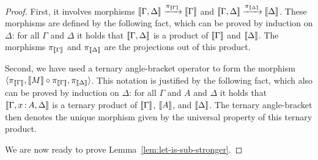 \begin{proof}
  First, it involves morphisms
   \(\left\llbracket \Gamma,\Delta\right\rrbracket \xrightarrow{\pi_{\left\llbracket \Gamma\right\rrbracket}} \left\llbracket \Gamma\right\rrbracket \)
  and
   \(\left\llbracket \Gamma,\Delta\right\rrbracket \xrightarrow{\pi_{\left\llbracket \Delta\right\rrbracket}} \left\llbracket \Delta\right\rrbracket\).
  These morphisms are defined by the following fact, which can be proved
  by induction on \(\Delta\): for all \(\Gamma\) and \(\Delta\)
  it holds that \(\left\llbracket \Gamma,\Delta\right\rrbracket\) is a product of \(\left\llbracket \Gamma\right\rrbracket\) and \(\left\llbracket \Delta\right\rrbracket\).
  The morphisms \(\pi_{\left\llbracket \Gamma\right\rrbracket}\) and \(\pi_{\left\llbracket \Delta\right\rrbracket}\) are the projections
  out of this product.

  Second, we have used a ternary angle-bracket operator
  to form the morphism \(\langle \pi_{\left\llbracket \Gamma\right\rrbracket},\left\llbracket M\right\rrbracket\circ\pi_{\left\llbracket \Gamma\right\rrbracket},\pi_{\left\llbracket \Delta\right\rrbracket}\rangle\).
  This notation is justified by the following fact, which also can be proved by induction on \(\Delta\):
  for all \(\Gamma\) and \(A\) and \(\Delta\) it holds that \(\left\llbracket \Gamma,x\,{:}\, A,\Delta\right\rrbracket\)
  is a ternary product of \(\left\llbracket \Gamma\right\rrbracket\), \(\left\llbracket A\right\rrbracket\), and \(\left\llbracket \Delta\right\rrbracket\).
  The ternary angle-bracket then denotes the unique morphism
  given by the universal property of this ternary product.

  We are now ready to prove Lemma~\ref{lem:let-is-sub-stronger}.


\end{proof}
